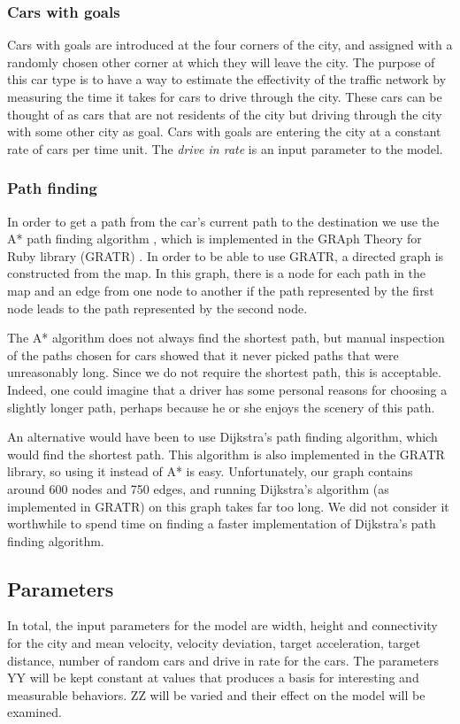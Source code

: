 \documentclass[11pt,a4paper]{article}
\begin{document}
\subsubsection{Cars with goals}
Cars with goals are introduced at the four corners of the city, and assigned with a randomly chosen other corner at which they will leave the city. The purpose of this car type is to have a way to estimate the effectivity of the traffic network by measuring the time it takes for cars to drive through the city. These cars can be thought of as cars that are not residents of the city but driving through the city with some other city as goal. Cars with goals are entering the city at a constant rate of cars per time unit. The \textit{drive in rate} is an input parameter to the model.
\subsubsection{Path finding}
In order to get a path from the car's current path to the destination we use the
A* path finding algorithm \cite{astar}, which is implemented in the GRAph Theory
for Ruby library (GRATR) \cite{gratr}. In order to be able to use GRATR, a
directed graph is constructed from the map. In this graph, there is a node for
each path in the map and an edge from one node to another if the path
represented by the first node leads to the path represented by the second node.

The A* algorithm does not always find the shortest path, but manual inspection
of the paths chosen for cars showed that it never picked paths that were
unreasonably long. Since we do not require the shortest path, this is
acceptable. Indeed, one could imagine that a driver has some personal reasons
for choosing a slightly longer path, perhaps because he or she enjoys the
scenery of this path.

An alternative would have been to use Dijkstra's path finding algorithm, which
would find the shortest path. This algorithm is also implemented in the GRATR
library, so using it instead of A* is easy. Unfortunately, our graph contains
around 600 nodes and 750 edges, and running Dijkstra's algorithm (as implemented
in GRATR) on this graph takes far too long. We did not consider it worthwhile
to spend time on finding a faster implementation of Dijkstra's path finding
algorithm.

\subsection{Parameters}
In total, the input parameters for the model are width, height and connectivity for the city and mean velocity, velocity deviation, target acceleration, target distance, number of random cars and drive in rate for the cars. The parameters YY will be kept constant at values that produces a basis for interesting and measurable behaviors. ZZ will be varied and their effect on the model will be examined.
\end{document}
